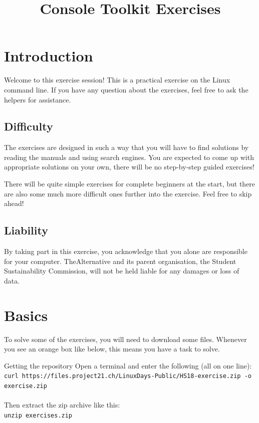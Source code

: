 \documentclass{TheAlternativeCourse}
\title{Console Toolkit Exercises}
\date{}
\author{}
\begin{document}
\maketitle

\setlength{\parindent}{0cm}
\setlength{\parskip}{12pt}

\section{Introduction}

Welcome to this exercise session! This is a practical exercise on the Linux
command line.  If you have any question about the exercises, feel free to ask
the helpers for assistance.

\subsection*{Difficulty}

The exercises are designed in such a way that you will have to find solutions
by reading the manuals and using search engines. You are expected to come up
with appropriate solutions on your own, there will be no step-by-step guided
exercises!

There will be quite simple exercises for complete beginners at the start,
but there are also some much more difficult ones further into the exercise.
Feel free to skip ahead!

\subsection*{Liability}

By taking part in this exercise, you acknowledge that you alone are responsible
for your computer. TheAlternative and its parent organisation, the Student
Sustainability Commission, will not be held liable for any damages or loss of
data.

\pagebreak

\section{Basics}

To solve some of the exercises, you will need to download some files. Whenever
you see an orange box like below, this means you have a task to solve.

\begin{exercisebox}{Getting the repository}
    Open a terminal and enter the following (all on one line): \\
    \texttt{curl https://files.project21.ch/LinuxDays-Public/HS18-exercise.zip
        -o exercise.zip} \\\\
    Then extract the zip archive like this: \\
    \texttt{unzip exercises.zip}
\end{exercisebox}
\end{document}

